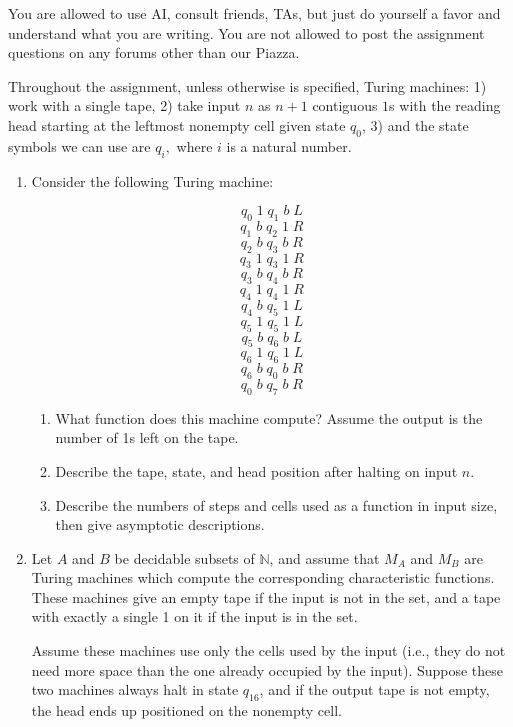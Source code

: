 \documentclass[11pt]{article}
\begin{document}
You are allowed to use AI, consult friends, TAs, but just do yourself a favor and understand what you are writing.  You are not allowed to post the assignment questions on any forums other than our Piazza.  

\vspace{0.2cm}

Throughout the assignment, unless otherwise is specified, Turing machines:
1) work with a single tape, 
2) take input $n$ as $n+1$ contiguous $1$s with the reading head starting at the leftmost nonempty cell given state $q_0$,
3) and the state symbols we can use are $q_i,$ where $i$ is a natural number. 

\begin{enumerate}[{\bf Q1.}]

    \item Consider the following Turing machine:

    $$q_0\; 1 \; q_1 \; b \; L$$
    $$q_1\; b \; q_2 \; 1 \; R$$
    $$q_2\; b \; q_3 \; b \; R$$
    $$q_3\; 1 \; q_3 \; 1\; R$$
    $$q_3\; b \; q_4 \; b\; R$$
    $$q_4\; 1 \; q_4 \; 1\; R$$
    $$q_4\; b \; q_5 \; 1\; L$$
    $$q_5\; 1 \; q_5 \; 1\; L$$
    $$q_5\; b \; q_6 \; b\; L$$
    $$q_6\; 1 \; q_6 \; 1\; L$$
    $$q_6\; b \; q_0 \; b\; R$$
    $$q_0\; b \; q_7 \; b\; R$$

    \begin{enumerate}
        \item What function does this machine compute? Assume the output is the number of 1s left on the tape.
        \item Describe the tape, state, and head position after halting on input $n$. 
        \item Describe the numbers of steps and cells used as a function in input size, then give asymptotic descriptions.
    \end{enumerate}
    
 \newpage

    \item Let $A$ and $B$ be decidable subsets of $\mathbb{N}$, and assume that $M_A$ and $M_B$ are Turing machines which compute the corresponding characteristic functions. These machines give an empty tape if the input is not in the set, and a tape with exactly a single 1 on it if the input is in the set. 
    
    Assume these machines use only the cells used by the input (i.e., they do not need more space than the one already occupied by the input). Suppose these two machines always halt in state $q_{16}$, and if the output tape is not empty, the head ends up positioned on the nonempty cell. 


\end{enumerate}
\end{document}
